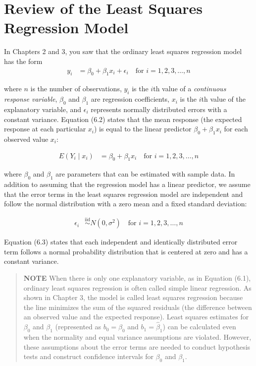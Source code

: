\documentclass[
]{book}
\begin{document}
\hypertarget{review-of-the-least-squares-regression-model}{%
\section{Review of the Least Squares Regression Model}\label{review-of-the-least-squares-regression-model}}

In Chapters 2 and 3, you saw that the ordinary least squares regression model has the form
\begin{align}
y_i &= \beta_0 + \beta_1 x_i + \epsilon_i
\quad\text{for } i = 1, 2, 3, \dots, n
\tag{6.1}
\end{align}

where \(n\) is the number of observations, \(y_i\) is the \(i\)th value of a \textit{continuous response variable}, \(\beta_0\) and \(\beta_1\) are regression coefficients, \(x_i\) is the \(i\)th value of the explanatory variable, and \(\epsilon_i\) represents normally distributed errors with a constant variance. Equation (6.2) states that the mean response (the expected response at each particular \(x_i\)) is equal to the linear predictor \(\beta_0 + \beta_1 x_i\) for each observed value \(x_i\):

\begin{align}
E(Y_i \mid x_i) &= \beta_0 + \beta_1 x_i 
\quad\text{for } i = 1, 2, 3, \dots, n
\tag{6.2}
\end{align}

where \(\beta_0\) and \(\beta_1\) are parameters that can be estimated with sample data. In addition to assuming that the regression model has a linear predictor, we assume that the error terms in the least squares regression model are independent and follow the normal distribution with a zero mean and a fixed standard deviation:

\begin{align}
\epsilon_i &\overset{\mathrm{iid}}{\sim} N(0, \sigma^2) 
\quad\text{for } i = 1, 2, 3, \dots, n
\tag{6.3}
\end{align}

Equation (6.3) states that each independent and identically distributed error term follows a normal probability
distribution that is centered at zero and has a constant variance.

\begin{quote}
\textbf{NOTE}
When there is only one explanatory variable, as in Equation (6.1), ordinary least squares regression is often called simple linear regression. As shown in Chapter 3, the model is called least squares regression because the line minimizes the sum of the squared residuals (the difference between an observed value and the expected response). Least squares estimates for \(\beta_0\) and \(\beta_1\) (represented as \(b_0 = \hat\beta_0\) and \(b_1 = \hat\beta_1\)) can be calculated even when the normality and equal variance assumptions are violated. However, these assumptions about the error terms are needed to conduct hypothesis tests and construct confidence intervals for \(\beta_0\) and \(\beta_1\).
\end{quote}
\end{document}
